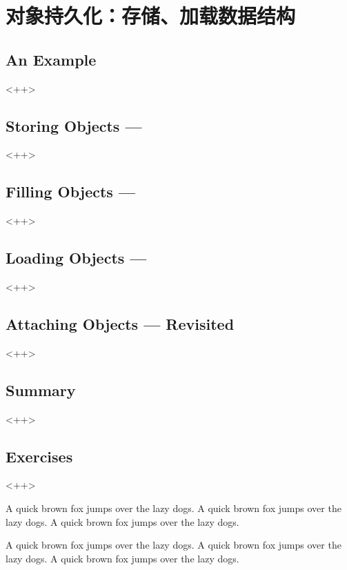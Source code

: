 

\chapter{对象持久化：存储、加载数据结构}
\label{ch:PersistentObjects}

\section{An Example}<++>

\section{Storing Objects ---}<++>

\section{Filling Objects ---}<++>

\section{Loading Objects ---}<++>

\section{Attaching Objects --- Revisited}<++>

\section{Summary}<++>

\section{Exercises}<++>

A quick brown fox jumps over the lazy dogs.
A quick brown fox jumps over the lazy dogs.
A quick brown fox jumps over the lazy dogs.

A quick brown fox jumps over the lazy dogs.
A quick brown fox jumps over the lazy dogs.
A quick brown fox jumps over the lazy dogs.

\newpage{\thispagestyle{empty}\cleardoublepage}

